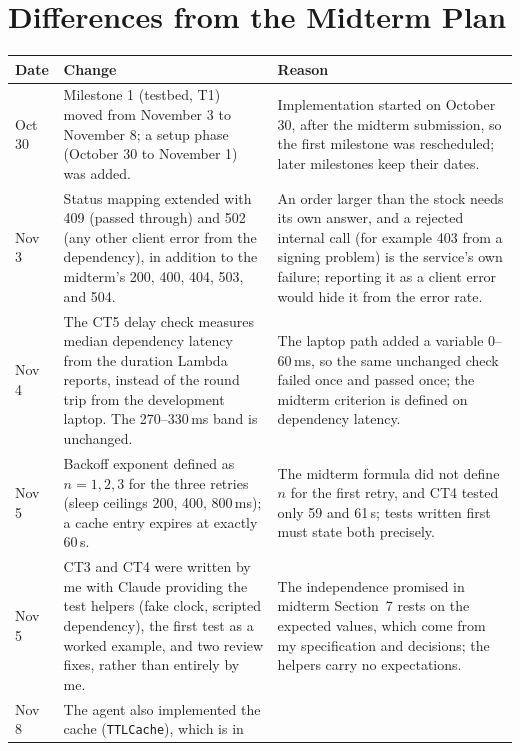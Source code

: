 \documentclass[10pt]{article}
\begin{document}
\section{Differences from the Midterm Plan}\label{sec:differences}

\begin{table}[htbp]
\centering
\footnotesize
\begin{tabularx}{\linewidth}{@{}l>{\RaggedRight}X>{\RaggedRight\arraybackslash}X@{}}
\toprule
\textbf{Date} & \textbf{Change} & \textbf{Reason} \\
\midrule
Oct 30 & Milestone 1 (testbed, T1) moved from November 3 to November 8;
  a setup phase (October 30 to November 1) was added. &
  Implementation started on October 30, after the midterm submission, so the
  first milestone was rescheduled; later milestones keep their dates. \\
Nov 3 & Status mapping extended with 409 (passed through) and 502 (any other
  client error from the dependency), in addition to the midterm's 200, 400, 404,
  503, and 504. &
  An order larger than the stock needs its own answer, and a rejected internal
  call (for example 403 from a signing problem) is the service's own failure;
  reporting it as a client error would hide it from the error rate. \\
Nov 4 & The CT5 delay check measures median dependency latency from the
  duration Lambda reports, instead of the round trip from the development
  laptop. The 270--330\,ms band is unchanged. &
  The laptop path added a variable 0--60\,ms, so the same unchanged check
  failed once and passed once; the midterm criterion is defined on dependency
  latency. \\
Nov 5 & Backoff exponent defined as $n = 1, 2, 3$ for the three retries
  (sleep ceilings 200, 400, 800\,ms); a cache entry expires at exactly 60\,s. &
  The midterm formula did not define $n$ for the first retry, and CT4 tested
  only 59 and 61\,s; tests written first must state both precisely. \\
Nov 5 & CT3 and CT4 were written by me with Claude providing the test helpers
  (fake clock, scripted dependency), the first test as a worked example, and
  two review fixes, rather than entirely by me. &
  The independence promised in midterm Section~7 rests on the expected
  values, which come from my specification and decisions; the helpers carry no
  expectations. \\
Nov 8 & The agent also implemented the cache (\texttt{TTLCache}), which is in

\end{tabularx}
\end{table}
\end{document}
